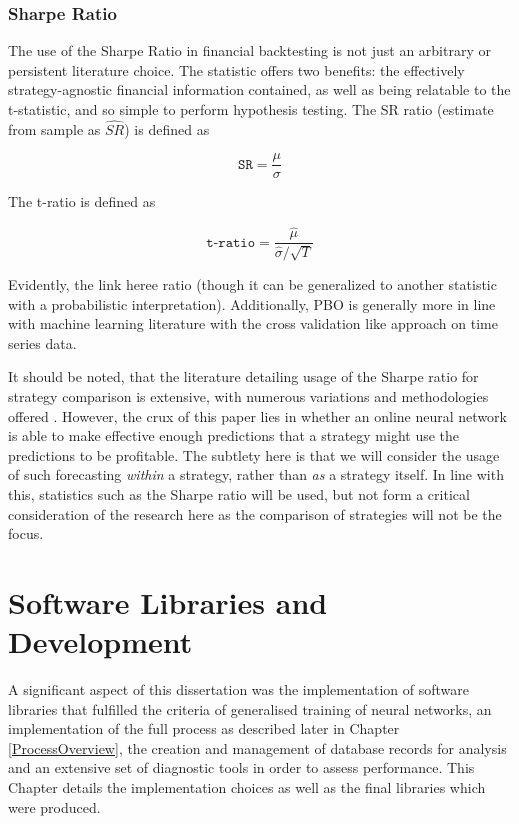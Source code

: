 \documentclass[a4paper,11pt,oneside]{article}
\theoremstyle{plain}
\theoremstyle{definition}
\begin{document}
\subsubsection {Sharpe Ratio}

The use of the Sharpe Ratio in financial backtesting is not just an arbitrary or persistent literature choice. 
The statistic offers two benefits: the effectively strategy-agnostic financial information contained, as well as being 
relatable to the t-statistic, and so simple to perform hypothesis testing. The SR ratio (estimate from sample as $\hat{SR}$) 
is defined as

\begin{equation}\label{SR}
  \texttt{SR}=\frac{\mu}{\sigma}
\end{equation}

The t-ratio is defined as 

\begin{equation}\label{tratio}
  \texttt{t-ratio} = \frac{\hat{\mu}}{\hat{\sigma}/\sqrt{T}}
\end{equation}

Evidently, the link heree ratio (though it can be generalized to another statistic with a probabilistic interpretation). Additionally, 
PBO is generally more in line with machine learning literature with the cross validation like approach on time series data.  
\hfill \break 

It should be noted, that the literature detailing usage of the Sharpe ratio for strategy comparison is extensive, with 
numerous variations and methodologies offered \cite{BaileySharpe}. However, the crux of this paper lies 
in whether an online neural network is able to make effective enough predictions that a strategy might use the 
predictions to be profitable. The subtlety here is that we will consider the usage of such forecasting \textit{within} a strategy,
 rather than \textit{as} a strategy itself. In line with this, statistics such as the Sharpe ratio will be used, but not form a critical 
 consideration of the research here as the comparison of strategies will not be the focus.
\hfill \break 

\newpage

\section{Software Libraries and Development}\label{Software}

A significant aspect of this dissertation was the implementation of software libraries that fulfilled the criteria of generalised training of neural networks, an implementation of the full process as described later in Chapter \ref{ProcessOverview}, the creation and management of database records for analysis and an extensive set of diagnostic tools in order to assess performance. This Chapter details the implementation choices as well as the final libraries which were produced.
\end{document}
